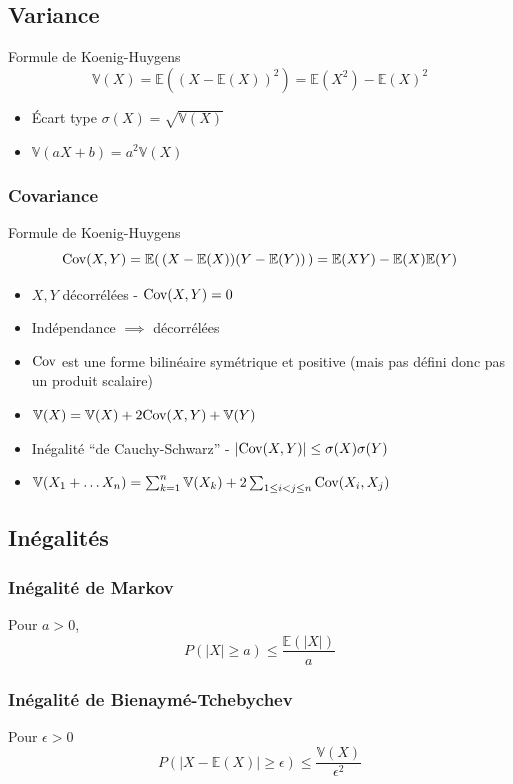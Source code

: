 \documentclass[openany]{book}
\begin{document}
\subsection{Variance}
Formule de Koenig-Huygens
\[ \mathbb{V}(X) = \mathbb{E} \left ((X - \mathbb{E}(X))^2 \right ) = \mathbb{E}(X^2) - \mathbb{E}(X)^2 \]

\begin{itemize}
    \item Écart type $\sigma(X) = \sqrt{\mathbb{V}(X)}$
    \item $\mathbb{V}(aX+b) = a^2\mathbb{V}(X)$
\end{itemize}

\subsubsection{Covariance}
Formule de Koenig-Huygens
\[ \text{Cov} (X, Y) = \mathbb{E}( \, (X - \mathbb{E}(X))(Y - \mathbb{E}(Y)) \, ) = \mathbb{E}(XY) - \mathbb{E}(X)\mathbb{E}(Y) \]

\begin{itemize}
    \item $X, Y$ décorrélées - $\text{Cov} (X, Y) = 0$
    \item Indépendance $\implies$ décorrélées
    \item $\text{Cov}$ est une forme bilinéaire symétrique et positive (mais pas défini donc pas un produit scalaire)
    \item $\mathbb{V}(X) = \mathbb{V}(X) + 2 \text{Cov} (X, Y) + \mathbb{V}(Y)$
    \item Inégalité ``de Cauchy-Schwarz'' - $|\text{Cov} (X, Y)| \leq \sigma (X) \sigma (Y)$
    \item $\mathbb{V}(X_1 + \dots X_n) = \sum_{k=1}^{n} \mathbb{V}(X_k) + 2 \sum_{1 \leq i < j \leq n} \text{Cov}(X_i, X_j)$
\end{itemize}

\subsection{Inégalités}
\subsubsection{Inégalité de Markov}
Pour $a > 0$,
\[ P(|X| \geq a) \leq \frac{\mathbb{E}(|X|)}{a} \]

\subsubsection{Inégalité de Bienaymé-Tchebychev}
Pour $\epsilon > 0$
\[ P( | X - \mathbb{E}(X) | \geq \epsilon ) \leq \frac{\mathbb{V}(X)}{\epsilon^2} \]
\end{document}
